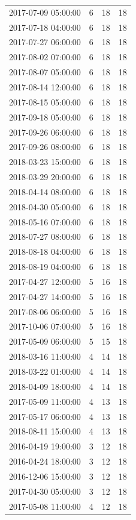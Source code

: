 \begin{tabular}{lrrr}
2017-07-09 05:00:00 & 6 & 18 & 18 \\
2017-07-18 04:00:00 & 6 & 18 & 18 \\
2017-07-27 06:00:00 & 6 & 18 & 18 \\
2017-08-02 07:00:00 & 6 & 18 & 18 \\
2017-08-07 05:00:00 & 6 & 18 & 18 \\
2017-08-14 12:00:00 & 6 & 18 & 18 \\
2017-08-15 05:00:00 & 6 & 18 & 18 \\
2017-09-18 05:00:00 & 6 & 18 & 18 \\
2017-09-26 06:00:00 & 6 & 18 & 18 \\
2017-09-26 08:00:00 & 6 & 18 & 18 \\
2018-03-23 15:00:00 & 6 & 18 & 18 \\
2018-03-29 20:00:00 & 6 & 18 & 18 \\
2018-04-14 08:00:00 & 6 & 18 & 18 \\
2018-04-30 05:00:00 & 6 & 18 & 18 \\
2018-05-16 07:00:00 & 6 & 18 & 18 \\
2018-07-27 08:00:00 & 6 & 18 & 18 \\
2018-08-18 04:00:00 & 6 & 18 & 18 \\
2018-08-19 04:00:00 & 6 & 18 & 18 \\
2017-04-27 12:00:00 & 5 & 16 & 18 \\
2017-04-27 14:00:00 & 5 & 16 & 18 \\
2017-08-06 06:00:00 & 5 & 16 & 18 \\
2017-10-06 07:00:00 & 5 & 16 & 18 \\
2017-05-09 06:00:00 & 5 & 15 & 18 \\
2018-03-16 11:00:00 & 4 & 14 & 18 \\
2018-03-22 01:00:00 & 4 & 14 & 18 \\
2018-04-09 18:00:00 & 4 & 14 & 18 \\
2017-05-09 11:00:00 & 4 & 13 & 18 \\
2017-05-17 06:00:00 & 4 & 13 & 18 \\
2018-08-11 15:00:00 & 4 & 13 & 18 \\
2016-04-19 19:00:00 & 3 & 12 & 18 \\
2016-04-24 18:00:00 & 3 & 12 & 18 \\
2016-12-06 15:00:00 & 3 & 12 & 18 \\
2017-04-30 05:00:00 & 3 & 12 & 18 \\
2017-05-08 11:00:00 & 4 & 12 & 18 \\

\end{tabular}
